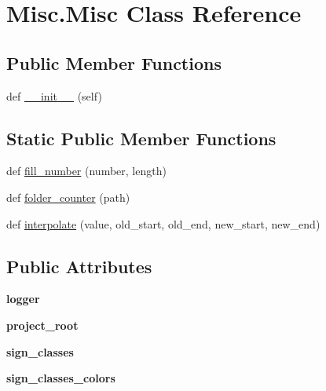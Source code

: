 \hypertarget{class_misc_1_1_misc}{}\section{Misc.\+Misc Class Reference}
\label{class_misc_1_1_misc}
\subsection*{Public Member Functions}
\begin{DoxyCompactItemize}
\item 
def \mbox{\hyperlink{class_misc_1_1_misc_a2361f15b11e4875dff86f4bedf58dc31}{\+\_\+\+\_\+init\+\_\+\+\_\+}} (self)
\end{DoxyCompactItemize}
\subsection*{Static Public Member Functions}
\begin{DoxyCompactItemize}
\item 
def \mbox{\hyperlink{class_misc_1_1_misc_a58fba0bed4c5f2ff76cdf83e20670fb4}{fill\+\_\+number}} (number, length)
\item 
def \mbox{\hyperlink{class_misc_1_1_misc_a8d30d14e25c28f7f8ac3798e501d4aaa}{folder\+\_\+counter}} (path)
\item 
def \mbox{\hyperlink{class_misc_1_1_misc_a13003135b0176722b987635ea8a52746}{interpolate}} (value, old\+\_\+start, old\+\_\+end, new\+\_\+start, new\+\_\+end)
\end{DoxyCompactItemize}
\subsection*{Public Attributes}
\begin{DoxyCompactItemize}
\item 
\mbox{\label{class_misc_1_1_misc_a9e3b421db2e29f51ea2ccf751dc3be28}} 
{\bfseries logger}
\item 
\mbox{\label{class_misc_1_1_misc_a0f0f549a61cc2c0682e3168d7e5d179d}} 
{\bfseries project\+\_\+root}
\item 
\mbox{\label{class_misc_1_1_misc_a18a052f60a59bcbb8c50936ed0e19501}} 
{\bfseries sign\+\_\+classes}
\item 
\mbox{\label{class_misc_1_1_misc_a3956381cbf1848ff93d562dad430dc36}} 
{\bfseries sign\+\_\+classes\+\_\+colors}
\end{DoxyCompactItemize}


